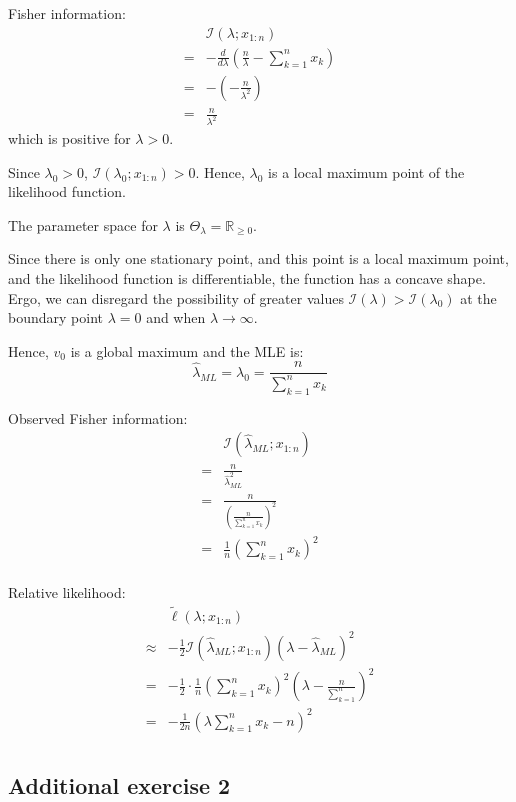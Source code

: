 \documentclass{article}
\begin{document}
\begin{ssolution}
Fisher information:
\begin{align*}
	& \mathcal{I}(\lambda;x_{1:n}) \\
	=& -\frac{d}{d\lambda}\left( \frac{n}{\lambda} - \sum_{k=1}^n x_k \right) \\
	=& -\left( -\frac{n}{\lambda^2} \right) \\
	=& \frac{n}{\lambda^2}
\end{align*}
which is positive for \(\lambda>0\).

Since \(\lambda_0>0\), \(\mathcal{I}(\lambda_0;x_{1:n})>0\).
Hence, \(\lambda_0\) is a local maximum point of the likelihood function.

The parameter space for \(\lambda\) is \(\Theta_\lambda = \mathbb{R}_{\geq 0}\).

Since there is only one stationary point, and this point is a local maximum point,
and the likelihood function is differentiable,
the function has a concave shape.
Ergo, we can disregard the possibility of greater values
\(\mathcal{I}(\lambda)>\mathcal{I}(\lambda_0)\)
at the boundary
point \(\lambda=0\) and when \(\lambda\to \infty\).

Hence, \(v_0\) is a global maximum and the MLE is:
\[\hat{\lambda}_{ML} = \lambda_0 = \frac{n}{\sum_{k=1}^n x_k}\]

Observed Fisher information:
\begin{align*}
	& \mathcal{I}(\hat{\lambda}_{ML};x_{1:n}) \\
	=& \frac{n}{\hat{\lambda}_{ML}^2} \\
	=& \frac{n}{\left(\frac{n}{\sum_{k=1}^n x_k}\right)^2} \\
	=& \frac{1}{n}\left(\sum_{k=1}^n x_k\right)^2 \\
\end{align*}

Relative likelihood:
\begin{align*}
	& \tilde{\ell}(\lambda;x_{1:n}) \\
	\approx& -\frac12 \mathcal{I}(\hat{\lambda}_{ML};x_{1:n})(\lambda-\hat{\lambda}_{ML})^2 \\
	=& -\frac12 \cdot \frac{1}{n}\left(\sum_{k=1}^n x_k\right)^2\left(\lambda-\frac{n}{\sum_{k=1}^n}\right)^2 \\
	=& -\frac{1}{2n} \left(\lambda\sum_{k=1}^n x_k-n\right)^2 \\
\end{align*}

\end{ssolution}

\subsection{Additional exercise 2}
\end{document}

